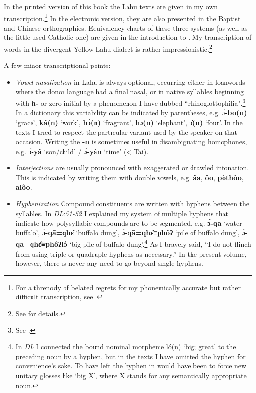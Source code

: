 In the printed version of this book the Lahu texts are given in my own
transcription.\footnote{For a threnody of belated regrets for my
  phonemically accurate but rather difficult transcription, see
  \citet{matisoff2014}.} In the electronic version, they are also presented
in the Baptist and Chinese orthographies. Equivalency charts of these
three systems (as well as the little-used Catholic one) are given in
the introduction to \citet[pp.14-28]{88}. My transcription of words in
the divergent Yellow Lahu dialect is rather
impressionistic.\footnote{See \citet{matisoff1969lahu} for details.}

A few minor transcriptional points:

\begin{itemize}

\item
  \emph{Vowel nasalization} in Lahu is always optional, occurring
  either in loanwords where the donor language had a final nasal, or
  in native syllables beginning with \textbf{h-} or zero-initial by a
  phenomenon I have dubbed ``rhinoglottophilia".\footnote{See
    \citet{m75}.} In a dictionary this variability can be indicated by
  parentheses, e.g. \textbf{ɔ̀-bo(n)} `grace', \textbf{ká(n) }`work',
  \textbf{hɔ́(n) }`fragrant', \textbf{hɔ(n) }`elephant', \textbf{ɔ̂(n)}
    `four'. In the texts I tried to respect the particular variant
  used by the speaker on that occasion. Writing the \textbf{-n} is
  sometimes useful in disambiguating homophones, e.g. \textbf{ɔ̀-yâ}
  `son/child' / \textbf{ɔ̀-yân} `time' (\textless{} Tai).

\item
  \emph{Interjections }are usually pronounced with exaggerated or
  drawled intonation. This is indicated by writing them with double
  vowels, e.g.  \textbf{âa}, \textbf{ôo}, \textbf{pòthôo},\textbf{
    alôo}.

\item
  \emph{Hyphenization} Compound constituents are written with
  hyphens between the syllables. In \emph{DL:51-52} I explained my
  system of multiple hyphens that indicate how polysyllabic compounds
  are to be segmented, e.g. \textbf{ɔ́-qā} `water buffalo',
  \textbf{ɔ́-qā=qhɛ̂} `buffalo dung', \textbf{ɔ́-qā=qhɛ̂≡phôʔ} `pile of
  buffalo dung', \textbf{ɔ́-qā=qhɛ̂≡phôʔ\quadruplehyphen ló} `big pile of buffalo
  dung'.\footnote{In \emph{DL} I connected the bound nominal morpheme
    ló(n) `big; great' to the preceding noun by a hyphen, but in the
    texts I have omitted the hyphen for convenience's sake. To have
    left the hyphen in would have been to force new unitary glosses
    like `big X', where X stands for any semantically appropriate
    noun.} As I bravely said, ``I do not flinch from using triple or
  quadruple hyphens as necessary.'' In the present volume, however,
  there is never any need to go beyond single hyphens.

\end{itemize}

